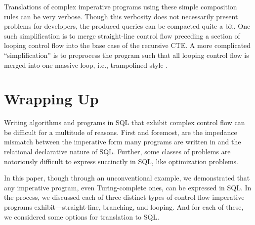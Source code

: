 \documentclass[sigconf,nonacm,screen,review,balance=false]{acmart}
\begin{document}
Translations of complex imperative programs using these simple composition rules
can be very verbose. Though this verbosity does not necessarily present
problems for developers, the produced queries can be compacted quite a bit. One
such simplification is to merge straight-line control flow preceding a section
of looping control flow into the base case of the recursive CTE. A more
complicated ``simplification'' is to preprocess the program such that all
looping control flow is merged into one massive loop, i.e., trampolined
style \cite{trampolinedstyle}.

\section{Wrapping Up}

Writing algorithms and programs in SQL that exhibit complex control flow can be
difficult for a multitude of reasons. First and foremost, are the impedance
mismatch between the imperative form many programs are written in and the
relational declarative nature of SQL. Further, some classes of problems are
notoriously difficult to express succinctly in SQL, like optimization
problems.

In this paper, though through an unconventional example, we demonstrated that
any imperative program, even Turing-complete ones, can be expressed in SQL. In
the process, we discussed each of three distinct types of control flow
imperative programs exhibit---straight-line, branching, and looping. And for
each of these, we considered some options for translation to SQL.



\end{document}
